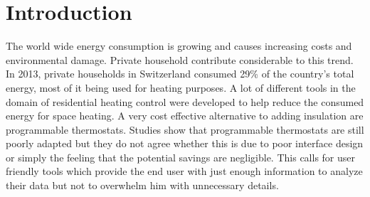 
\chapter{Introduction}
\label{sec:introduction}



The world wide energy consumption is growing and causes increasing costs and environmental damage.
Private household contribute considerable to this trend.
In 2013, private households in Switzerland consumed 29\% of the country's total energy\cite{schweizerischeGesamtenergiestatistik2013}, most of it being used for heating purposes\cite{analyseEnergieverbrauchVerwendungszwecke2013}.
A lot of different tools in the domain of residential heating control were developed to help reduce the consumed energy for space heating.
A very cost effective alternative to adding insulation are programmable thermostats.
Studies show that programmable thermostats are still poorly adapted but they do not agree whether this is due to poor interface design or simply the feeling that the potential savings are negligible.
This calls for user friendly tools which provide the end user with just enough information to analyze their data but not to overwhelm him with unnecessary details.



